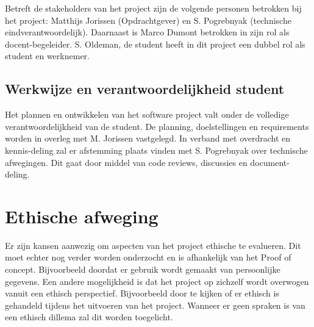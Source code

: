     Betreft de stakeholders van het project zijn de volgende personen betrokken bij het project: Matthijs Jorissen (Opdrachtgever) en  S. Pogrebnyak (technische eindverantwoordelijk). Daarnaast is Marco Dumont betrokken in zijn rol als docent-begeleider. S. Oldeman, de student heeft in dit project een dubbel rol als student en werknemer.

    \subsection{Werkwijze en verantwoordelijkheid student}

    Het plannen en ontwikkelen van het software project valt onder de volledige verantwoordelijkheid van de student. De planning, doelstellingen en requirements worden in overleg met M. Jorissen vastgelegd. In verband met overdracht en kennis-deling zal er afstemming plaats vinden met S. Pogrebnyak over technische afwegingen. Dit gaat door middel van code reviews, discussies en document-deling.

\section{Ethische afweging} %

Er zijn kansen aanwezig om aspecten van het project ethische te evalueren. Dit moet echter nog verder worden onderzocht en is afhankelijk van het Proof of concept. Bijvoorbeeld doordat er gebruik wordt gemaakt van persoonlijke gegevens. Een andere mogelijkheid is dat het project op zichzelf wordt overwogen vanuit een ethisch perspectief. Bijvoorbeeld door te kijken of er ethisch is gehandeld tijdens het uitvoeren van het project. Wanneer er geen spraken is van een ethisch dillema zal dit worden toegelicht.